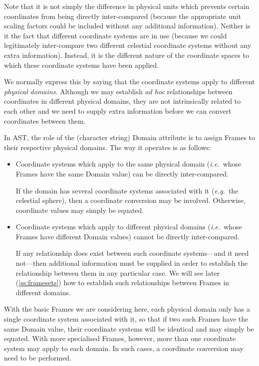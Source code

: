 \documentclass[twoside,11pt]{article}
\newcommand{\secref}[1]{\S\ref{#1}}
\renewcommand{\secref}[1]{\ref{#1}}
\begin{document}
Note that it is not simply the difference in physical units which
prevents certain coordinates from being directly inter-compared
(because the appropriate unit scaling factors could be included
without any additional information). Neither is it the fact that
different coordinate systems are in use (because we could legitimately
inter-compare two different celestial coordinate systems without any
extra information).  Instead, it is the different nature of the
coordinate spaces to which these coordinate systems have been applied.

We normally express this by saying that the coordinate systems apply
to different {\em{physical domains}}. Although we may establish
{\em{ad hoc}} relationships between coordinates in different physical
domains, they are not intrinsically related to each other and we need
to supply extra information before we can convert coordinates between
them.

In AST, the role of the (character string) Domain attribute is to
assign Frames to their respective physical domains. The way it
operates is as follows:

\begin{itemize}
\item Coordinate systems which apply to the same physical domain
({\em{i.e.}}\ whose Frames have the same Domain value) can be directly
inter-compared.

If the domain has several coordinate systems associated with it
({\em{e.g.}}\ the celestial sphere), then a coordinate conversion may
be involved. Otherwise, coordinate values may simply be equated.

\item Coordinate systems which apply to different physical domains
({\em{i.e.}}\ whose Frames have different Domain values) cannot be
directly inter-compared.

If any relationship does exist between such coordinate systems---and
it need not---then additional information must be supplied in order to
establish the relationship between them in any particular case. We
will see later (\secref{ss:framesets}) how to establish such
relationships between Frames in different domains.
\end{itemize}

With the basic Frames we are considering here, each physical domain
only has a single coordinate system associated with it, so that if two
such Frames have the same Domain value, their coordinate systems will
be identical and may simply be equated. With more specialised Frames,
however, more than one coordinate system may apply to each domain. In
such cases, a coordinate conversion may need to be performed.
\end{document}
